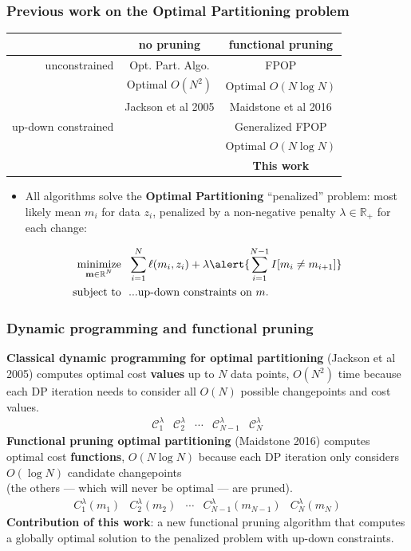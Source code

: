 \documentclass[t]{beamer}
\DeclareMathOperator*{\minimize}{minimize}
\newcommand{\RR}{\mathbb R}
\begin{document}
\begin{frame}
  \frametitle{Previous work
 on the Optimal Partitioning problem}
  \begin{tabular}{r|c|c}
    & no pruning & functional pruning \\
    \hline
    unconstrained & Opt. Part. Algo. & FPOP \\
     & Optimal $O(N^2)$ & Optimal $O(N\log N)$\\
    & Jackson et al 2005 & Maidstone et al 2016\\
    \hline
    up-down constrained &  & Generalized FPOP \\
     &  & Optimal $O(N\log N)$\\
    &  & \textbf{This work}\\
    \hline
  \end{tabular}
  \begin{itemize}
  \item All algorithms solve the \textbf{Optimal Partitioning}
    ``penalized'' problem: most likely mean $m_i$ for data $z_i$,
    penalized by a non-negative penalty $\lambda\in\RR_+$ \alert{for each change}:
  \end{itemize}
\begin{align*}
    \minimize_{\substack{
  \mathbf m\in\RR^{N}
  }} &\ \ 
    \sum_{i=1}^N \ell( m_i,  z_i)  + \lambda\alert{\sum_{i=1}^{N-1}I[m_{i}\neq m_{i+1}]}
\\
      \text{subject to} &\ \ \text{...up-down constraints on $m$.}
  \nonumber 
\end{align*}
\end{frame}

\begin{frame}
  \frametitle{Dynamic programming and functional pruning}
  \textbf{Classical dynamic programming for optimal partitioning}
  (Jackson et al 2005) computes optimal cost \textbf{values} up
  to $N$ data points, $O(N^2)$ time because each DP iteration needs to
  consider all $O(N)$ possible changepoints and cost values.
$$
\begin{array}{ccccc}
  \mathcal C^\lambda_{1} & \mathcal C^\lambda_2 & \cdots & \mathcal C^\lambda_{N-1} &  \mathcal C^\lambda_N
\end{array}
$$
\textbf{Functional pruning optimal partitioning} (Maidstone 2016)
computes optimal cost \textbf{functions}, $O(N\log N)$ because
each DP iteration only considers $O(\log N)$ candidate changepoints
\\(the others --- which will never be optimal --- are pruned).
$$
\begin{array}{ccccc}
  C^\lambda_{1}(m_1) 
  & C^\lambda_2(m_2) 
  & \cdots 
  & C^\lambda_{N-1}(m_{N-1}) 
  &   C^\lambda_N(m_{N})
\end{array}
$$
\textbf{Contribution of this work}: a new functional pruning algorithm
that computes a globally optimal solution to the penalized problem
with up-down constraints.
\end{frame}
\end{document}
